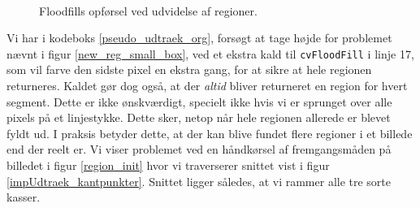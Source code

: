 {\begin{figure}[p]
    \setlength\fboxsep{0pt}
    \setlength\fboxrule{0.5pt}
    \centering
    \\
    \caption[]{
    Floodfills opførsel ved udvidelse af regioner.
    }
    \label{floodfill_return_entire_region}
\end{figure}

Vi har i kodeboks \ref{pseudo_udtraek_org}, forsøgt at tage højde for
problemet nævnt i figur \ref{new_reg_small_box}, ved et ekstra kald til
\texttt{cvFloodFill} i linje 17, som vil farve den sidste pixel en
ekstra gang, for at sikre at hele regionen returneres. Kaldet gør dog
også, at der \emph{altid} bliver returneret en region for hvert segment.
Dette er ikke ønskværdigt, specielt ikke hvis vi er sprunget over alle
pixels på et linjestykke. Dette sker, netop når hele regionen allerede
er blevet fyldt ud. I praksis betyder dette, at der kan blive fundet
flere regioner i et billede end der reelt er. Vi viser problemet ved en
håndkørsel af fremgangsmåden på billedet i figur \ref{region_init} hvor
vi traverserer snittet vist i figur \ref{impUdtraek_kantpunkter}.
Snittet ligger således, at vi rammer alle tre sorte kasser.

}
